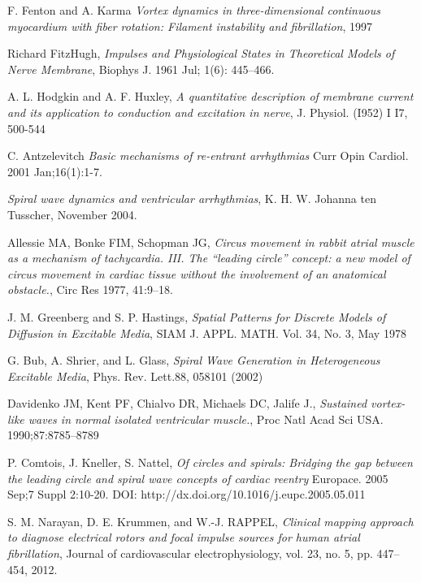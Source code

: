 \documentclass[twocolumn, a1paper]{article}
\begin{document}
\begin{thebibliography}{7}
F. Fenton and A. Karma
\emph{Vortex dynamics in three-dimensional continuous myocardium with fiber
rotation: Filament instability and fibrillation},
1997

Richard FitzHugh, 
\emph{Impulses and Physiological States in Theoretical Models of Nerve Membrane},
Biophys J. 1961 Jul; 1(6): 445–466.


A. L. Hodgkin and A. F. Huxley, 
\emph{A quantitative description of membrane current and its application to conduction and excitation in nerve},
J. Physiol. (I952) I I7, 500-544

 C. Antzelevitch
\emph{Basic mechanisms of re-entrant arrhythmias}
Curr Opin Cardiol. 2001 Jan;16(1):1-7.


\emph{Spiral wave dynamics and ventricular arrhythmias},
 K. H. W. Johanna ten Tusscher,
 November 2004.

Allessie MA, Bonke FIM, Schopman JG,
\emph{ Circus movement in rabbit atrial muscle as a mechanism of tachycardia. III. The “leading circle” concept: a new model of circus movement in cardiac tissue without the involvement of an anatomical obstacle.},
 Circ Res 1977, 41:9–18.

J. M. Greenberg and S. P. Hastings, 
\emph{Spatial Patterns for Discrete Models of Diffusion in Excitable Media}, 
SIAM J. APPL. MATH.
Vol. 34, No. 3, May 1978

G. Bub, A. Shrier, and L. Glass,
\emph{Spiral Wave Generation in Heterogeneous Excitable Media},
 Phys. Rev. Lett.88, 058101 (2002)

Davidenko JM, Kent PF, Chialvo DR, Michaels DC, Jalife J., 
\emph{Sustained vortex-like waves in normal isolated ventricular muscle.},
 Proc Natl Acad Sci USA. 1990;87:8785–8789

P. Comtois, J. Kneller, S. Nattel,
\emph{Of circles and spirals: Bridging the gap between the leading circle and spiral wave concepts of cardiac reentry}
Europace. 2005 Sep;7 Suppl 2:10-20.
DOI: http://dx.doi.org/10.1016/j.eupc.2005.05.011

S. M. Narayan, D. E. Krummen, and W.-J. RAPPEL, 
\emph{Clinical mapping approach to diagnose
electrical rotors and focal impulse sources for human atrial fibrillation},
 Journal of
cardiovascular electrophysiology, vol. 23, no. 5, pp. 447–454, 2012.




\end{thebibliography}
\end{document}
